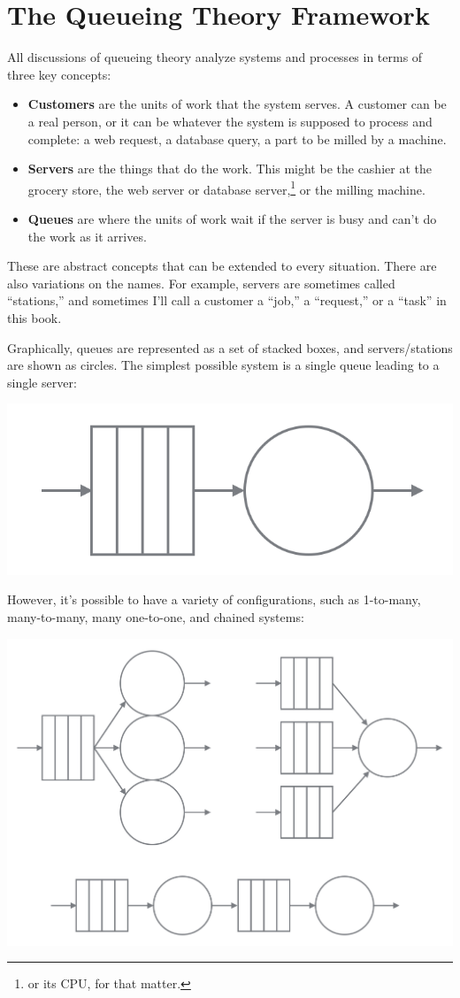 \documentclass{vivid_layout}
\begin{document}
\section{The Queueing Theory Framework}

All discussions of queueing theory analyze systems and processes in terms of three key concepts:

\begin{itemize}
\item {\bfseries Customers} are the units of work that the system serves. A customer can be a real person, or it can be whatever the system is supposed to process and complete: a web request, a database query, a part to be milled by a machine.
\item {\bfseries Servers} are the things that do the work. This might be the cashier at the grocery store, the web server or database server,\footnote{or its CPU, for that matter.} or the milling machine.
\item {\bfseries Queues} are where the units of work wait if the server is busy and can't do the work as it arrives.
\end{itemize}

These are abstract concepts that can be extended to every situation. There are also variations on the names. For example, servers are sometimes called ``stations,'' and sometimes I'll call a customer a ``job,'' a ``request,'' or a ``task'' in this book.

Graphically, queues are represented as a set of stacked boxes, and servers/stations are shown as circles.  The simplest possible system is a single queue leading to a single server:
\begin{center}
\includegraphics[width=.375\linewidth]{queueing-theory/queue-and-server}
\end{center}

However, it's possible to have a variety of configurations, such as 1-to-many, many-to-many, many one-to-one, and chained systems:
\begin{center}
\includegraphics[width=.65\linewidth]{queueing-theory/queue-configurations}
\end{center}
\end{document}

